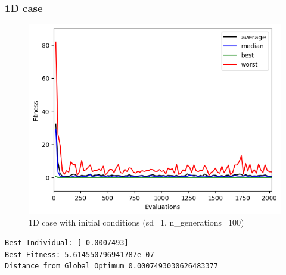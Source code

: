 \subsubsection{1D case}
\begin{figure}[H]
    \centering
    \includegraphics[width=\linewidth]{images/lab1/fitness_1D.png}
    \caption{1D case with initial conditions (sd=1, n\_generations=100)}
\end{figure}
\begin{lstlisting}
Best Individual: [-0.0007493]
Best Fitness: 5.614550796941787e-07
Distance from Global Optimum 0.0007493030626483377
\end{lstlisting}

